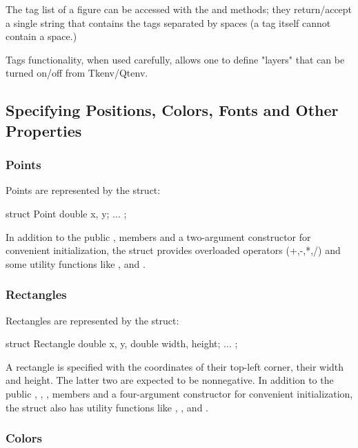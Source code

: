 The tag list of a figure can be accessed with the  and
  methods; they return/accept a single
string that contains the tags separated by spaces (a tag itself cannot
contain a space.)

Tags functionality, when used carefully, allows one to define "layers"
that can be turned on/off from Tkenv/Qtenv.


\subsection{Specifying Positions, Colors, Fonts and Other Properties}

\subsubsection{Points}

Points are represented by the  struct:

\begin{cpp}
struct Point {
    double x, y;
    ...
};
\end{cpp}

In addition to the public ,  members and a two-argument
constructor for convenient initialization, the struct provides overloaded
operators (+,-,*,/) and some utility functions like ,
 and .

\subsubsection{Rectangles}

Rectangles are represented by the  struct:

\begin{cpp}
struct Rectangle {
    double x, y,
    double width, height;
    ...
};
\end{cpp}

A rectangle is specified with the coordinates of their top-left corner,
their width and height. The latter two are expected to be nonnegative. In
addition to the public , , ,  members
and a four-argument constructor for convenient initialization, the struct
also has utility functions like , ,
 and .

\subsubsection{Colors}

